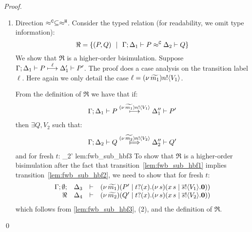 \begin{proof}
\begin{enumerate}

		\item	Direction $\approx^\mathtt{C} \subseteq \approx^\mathtt{H}$.
				\noi Consider the typed relation (for readability, we omit type information):
				\[
					\Re = \{
								(P, Q) 
								\ \ |\ \ 
								\Gamma; \Delta_1 \vdash P \approx^\mathtt{C} \Delta_2 \vdash Q\}
				\]
				We show that $\Re$ is a higher-order bisimulation.
				Suppose
				$
						\Gamma; \Delta_1 \vdash P \stackrel{ \ell}{\longmapsto} \Delta_1' \vdash P'
				$.
				The proof does a case analysis on the transition label $\ell$.
				Here again we only detail the case $\ell = (\nu\, \widetilde{m_1}) n ! \langle V_1 \rangle$.
				
				\smallskip

							\noi From the definition of $\Re$ we have that if:
							\begin{eqnarray}
								\Gamma; \Delta_1 \vdash P \stackrel{(\nu\, \widetilde{m_1}) n ! \langle V_1 \rangle}{\longmapsto} \Delta_1'' \vdash P'
								\label{lem:fwb_sub_hbf1}
							\end{eqnarray}
							then $\exists Q, V_2$ such that:
							\begin{eqnarray}
								\horel{\Gamma}{\Delta_2}{Q}{\Hby{\news{\widetilde{m_2}} \bactout{n}{V_2}}}{\Delta_2''}{Q'}
								\label{lem:fwb_sub_hbf2}
							\end{eqnarray}
							and for fresh $t$:
								{\fwb}
								{\Delta_2'}{}
								{lem:fwb_sub_hbf3}
							\noi 
							To show that $\Re$ is a higher-order bisimulation
							after the fact that transition~\eqref{lem:fwb_sub_hbf1} implies transition~\eqref{lem:fwb_sub_hbf2},
							we need to show that for fresh $t$:
							\begin{eqnarray}
								\begin{array}{rcll} \Gamma; \emptyset; &\Delta_3& \vdash& (\nu\, \widetilde{m_1})(P' \;|\; t ? (x) . (\nu\, s)(x\, {s} \;|\; \overline{s} ! \langle V_1 \rangle . \mathbf{0}))\\ \Re &\Delta_4& \vdash &  (\nu\, \widetilde{m_2})(Q' \;|\; t ? (x) . (\nu\, s)(x\, {s} \;|\; \overline{s} ! \langle V_2 \rangle . \mathbf{0})) \end{array}
								\label{lem:fwb_sub_hbf4}
							\end{eqnarray}
							which follows from \eqref{lem:fwb_sub_hbf3}, (2),
							and the definition of $\Re$.

	\end{enumerate}
	\qed
\end{proof}


